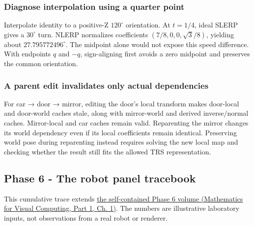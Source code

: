 \subsubsection{Diagnose interpolation using a quarter point}\label{appendix-92ff77d4dfdc-diagnose-interpolation-using-a-quarter-point}

\hypertarget{appendix-92ff77d4dfdc-diagnose-interpolation-using-a-quarter-point}{}

Interpolate identity to a positive-Z \(120^\circ\) orientation. At \(t=1/4\), ideal SLERP gives a \(30^\circ\) turn. NLERP normalizes coefficients \((7/8,0,0,\sqrt3/8)\), yielding about \(27.795772496^\circ\). The midpoint alone would not expose this speed difference. With endpoints \(q\) and \(-q\), sign-aligning first avoids a zero midpoint and preserves the common orientation.

\subsubsection{A parent edit invalidates only actual dependencies}\label{appendix-92ff77d4dfdc-a-parent-edit-invalidates-only-actual-dependencies}

\hypertarget{appendix-92ff77d4dfdc-a-parent-edit-invalidates-only-actual-dependencies}{}

For car → door → mirror, editing the door's local transform makes door-local and door-world caches stale, along with mirror-world and derived inverse/normal caches. Mirror-local and car caches remain valid. Reparenting the mirror changes its world dependency even if its local coefficients remain identical. Preserving world pose during reparenting instead requires solving the new local map and checking whether the result still fits the allowed TRS representation.

\subsection{Phase 6 - The robot panel tracebook}\label{appendix-92ff77d4dfdc-phase-6---the-robot-panel-tracebook}

\hypertarget{appendix-92ff77d4dfdc-phase-6---the-robot-panel-tracebook}{}

This cumulative trace extends \href{../02-Mathematics-for-Visual-Computing-P01/main.pdf\#01-foundations-i-ch017-the-panel-gives-us-a-reason-to-learn}{the self-contained Phase 6 volume (Mathematics for Visual Computing, Part 1, Ch. 1)}. The numbers are illustrative laboratory inputs, not observations from a real robot or renderer.

